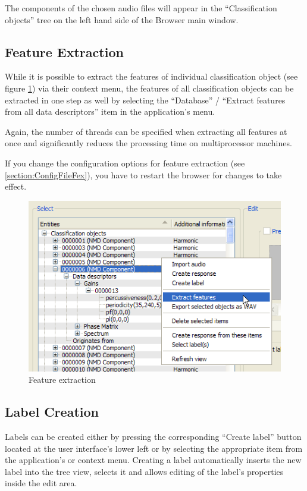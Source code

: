 The components of the chosen audio files will appear in the ``Classification
objects'' tree on the left hand side of the Browser main window.


\subsection{Feature Extraction}

While it is possible to extract the features of individual classification object
(see figure \ref{figure:FeatureExtraction}) via their context menu, the
features of all classification objects can be extracted in one step as well by
selecting the ``Database'' / ``Extract features from all data descriptors''
item in the application's menu.

Again, the number of threads can be specified when extracting all features at
once and significantly reduces the processing time on multiprocessor machines.

\begin{leftbar}
    If you change the configuration options for feature extraction (see
    \ref{section:ConfigFileFex}), you have to restart the browser for changes to
    take effect.
\end{leftbar}

\begin{figure}
    \includegraphics[width=.7\textwidth]{images/FeatureExtraction.png}
    \caption{%
        \label{figure:FeatureExtraction}%
        Feature extraction
    }
\end{figure}


\subsection{Label Creation}

Labels can be created either by pressing the corresponding ``Create label''
button located at the user interface's lower left or by selecting the
appropriate item from the application's or context menu. Creating a label
automatically inserts the new label into the tree view, selects it and allows
editing of the label's properties inside the edit area.


